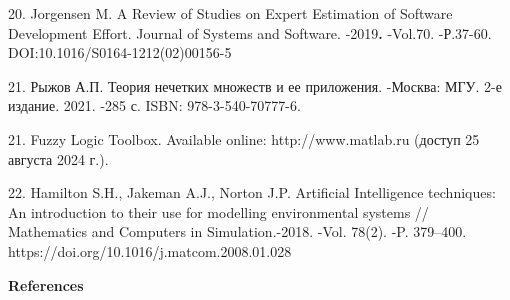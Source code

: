 \begin{noparindent}
20. Jorgensen M. A Review of Studies on Expert Estimation of Software
Development Effort. Journal of Systems and Software. -2019{\bfseries .}
-Vol.70. -Р.37-60. DOI:10.1016/S0164-1212(02)00156-5

21. Рыжов А.П. Теория нечетких множеств и ее приложения. -Москва: МГУ.
2-е издание. 2021. -285 с. ISBN: 978-3-540-70777-6.

21. Fuzzy Logic Toolbox. Available online: http://www.matlab.ru (доступ
25 августа 2024 г.).

22. Hamilton S.H., Jakeman A.J., Norton J.P. Artificial Intelligence
techniques: An introduction to their use for modelling environmental
systems // Mathematics and Computers in Simulation.-2018. -Vol. 78(2).
-P. 379--400. https://doi.org/10.1016/j.matcom.2008.01.028

\end{noparindent}

\begin{center}
    {\bfseries References}
\end{center}

